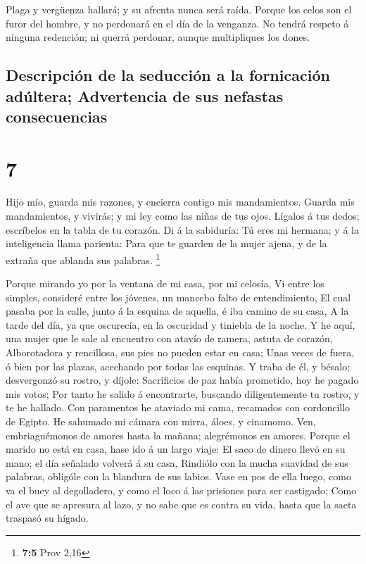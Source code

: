  Plaga y vergüenza hallará; y su afrenta nunca será raída.
 Porque los celos son el furor del hombre, y no perdonará
en el día de la venganza.  No tendrá respeto á ninguna
redención; ni querrá perdonar, aunque multipliques los dones.

\hypertarget{descripciuxf3n-de-la-seducciuxf3n-a-la-fornicaciuxf3n-aduxfaltera-advertencia-de-sus-nefastas-consecuencias}{%
\subsection{Descripción de la seducción a la fornicación adúltera;
Advertencia de sus nefastas
consecuencias}\label{descripciuxf3n-de-la-seducciuxf3n-a-la-fornicaciuxf3n-aduxfaltera-advertencia-de-sus-nefastas-consecuencias}}

\hypertarget{section-6}{%
\section{7}\label{section-6}}

 Hijo mío, guarda mis razones, y encierra contigo mis
mandamientos.  Guarda mis mandamientos, y vivirás; y mi ley
como las niñas de tus ojos.  Lígalos á tus dedos; escríbelos
en la tabla de tu corazón.  Di á la sabiduría: Tú eres mi
hermana; y á la inteligencia llama parienta:  Para que te
guarden de la mujer ajena, y de la extraña que ablanda sus palabras.
\footnote{\textbf{7:5} Prov 2,16}

 Porque mirando yo por la ventana de mi casa, por mi
celosía,  Vi entre los simples, consideré entre los jóvenes,
un mancebo falto de entendimiento,  El cual pasaba por la
calle, junto á la esquina de aquella, é iba camino de su casa,
 A la tarde del día, ya que oscurecía, en la oscuridad y
tiniebla de la noche.  Y he aquí, una mujer que le sale al
encuentro con atavío de ramera, astuta de corazón, 
Alborotadora y rencillosa, sus pies no pueden estar en casa;
 Unas veces de fuera, ó bien por las plazas, acechando por
todas las esquinas.  Y traba de él, y bésalo; desvergonzó
su rostro, y díjole:  Sacrificios de paz había prometido,
hoy he pagado mis votos;  Por tanto he salido á
encontrarte, buscando diligentemente tu rostro, y te he hallado.
 Con paramentos he ataviado mi cama, recamados con
cordoncillo de Egipto.  He sahumado mi cámara con mirra,
áloes, y cinamomo.  Ven, embriaguémonos de amores hasta la
mañana; alegrémonos en amores.  Porque el marido no está en
casa, hase ido á un largo viaje:  El saco de dinero llevó
en su mano; el día señalado volverá á su casa.  Rindiólo
con la mucha suavidad de sus palabras, obligóle con la blandura de sus
labios.  Vase en pos de ella luego, como va el buey al
degolladero, y como el loco á las prisiones para ser castigado;
 Como el ave que se apresura al lazo, y no sabe que es
contra su vida, hasta que la saeta traspasó su hígado.

